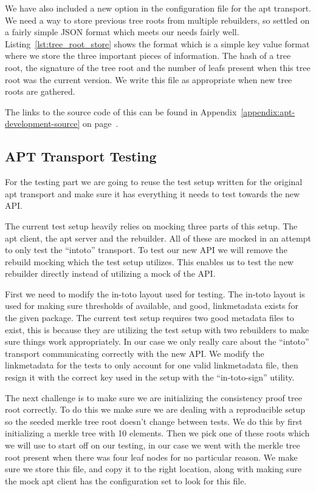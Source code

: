 \documentclass[../Main/thesis.tex]{subfiles}
\begin{document}
We have also included a new option in the configuration file for the apt
transport. We need a way to store previous tree roots from multiple rebuilders,
so settled on a fairly simple JSON format which meets our needs fairly well.
Listing~\ref{lst:tree_root_store} shows the format which is a simple key value
format where we store the three important pieces of information. The hash of a
tree root, the signature of the tree root and the number of leafs present when
this tree root was the current version. We write this file as appropriate when
new tree roots are gathered.

The links to the source code of this can be found in
Appendix~\ref{appendix:apt-development-source} on
page~\pageref{appendix:apt-development-source}.

\subsection*{APT Transport Testing}%
\label{sub:apt_transport_testing}
For the testing part we are going to reuse the test setup written for the
original apt transport and make sure it has everything it needs to test towards
the new API.

The current test setup heavily relies on mocking three parts of this setup. The
apt client, the apt server and the rebuilder. All of these are mocked in an
attempt to only test the ``intoto'' transport. To test our new API we will
remove the rebuild mocking which the test setup utilizes. This enables us to
test the new rebuilder directly instead of utilizing a mock of the API.

First we need to modify the in-toto layout used for testing. The in-toto layout
is used for making sure thresholds of available, and good, linkmetadata exists for
the given package. The current test setup requires two good metadata files to
exist, this is because they are utilizing the test setup with two rebuilders to
make sure things work appropriately. In our case we only really care about the
``intoto'' transport communicating correctly with the new API. We modify the
linkmetadata for the tests to only account for one valid linkmetadata file, then
resign it with the correct key used in the setup with the ``in-toto-sign''
utility.

The next challenge is to make sure we are initializing the consistency proof
tree root correctly. To do this we make sure we are dealing with a reproducible
setup so the seeded merkle tree root doesn't change between tests. We do this by
first initializing a merkle tree with 10 elements. Then we pick one of these
roots which we will use to start off on our testing, in our case we went with
the merkle tree root present when there was four leaf nodes for no particular
reason. We make sure we store this file, and copy it to the right location,
along with making sure the mock apt client has the configuration set to look for
this file.
\end{document}
